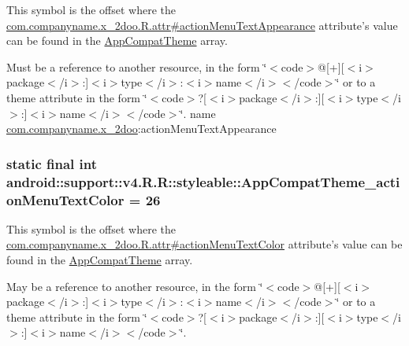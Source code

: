 This symbol is the offset where the \hyperlink{classcom_1_1companyname_1_1x__2doo_1_1_r_1_1attr_1a28aee481938a8a70bf5715b0402af9}{com.companyname.x\_\-2doo.R.attr\#actionMenuTextAppearance} attribute's value can be found in the \hyperlink{classandroid_1_1support_1_1v4_1_1_r_1_1styleable_0873e92ba21076bb5a4aeadeb7f5779f}{AppCompatTheme} array.

Must be a reference to another resource, in the form \char`\"{}$<$code$>$@\mbox{[}+\mbox{]}\mbox{[}$<$i$>$package$<$/i$>$:\mbox{]}$<$i$>$type$<$/i$>$:$<$i$>$name$<$/i$>$$<$/code$>$\char`\"{} or to a theme attribute in the form \char`\"{}$<$code$>$?\mbox{[}$<$i$>$package$<$/i$>$:\mbox{]}\mbox{[}$<$i$>$type$<$/i$>$:\mbox{]}$<$i$>$name$<$/i$>$$<$/code$>$\char`\"{}.  name \hyperlink{namespacecom_1_1companyname_1_1x__2doo}{com.companyname.x\_\-2doo}:actionMenuTextAppearance \hypertarget{classandroid_1_1support_1_1v4_1_1_r_1_1styleable_7c5193ab46252c56ec1b49d531de7e9d}{
\subsubsection[{AppCompatTheme\_\-actionMenuTextColor}]{\setlength{\rightskip}{0pt plus 5cm}static final int android::support::v4.R.R::styleable::AppCompatTheme\_\-actionMenuTextColor = 26}}
\label{classandroid_1_1support_1_1v4_1_1_r_1_1styleable_7c5193ab46252c56ec1b49d531de7e9d}


This symbol is the offset where the \hyperlink{classcom_1_1companyname_1_1x__2doo_1_1_r_1_1attr_6572796995e450d68baacd8e8ff1d867}{com.companyname.x\_\-2doo.R.attr\#actionMenuTextColor} attribute's value can be found in the \hyperlink{classandroid_1_1support_1_1v4_1_1_r_1_1styleable_0873e92ba21076bb5a4aeadeb7f5779f}{AppCompatTheme} array.

May be a reference to another resource, in the form \char`\"{}$<$code$>$@\mbox{[}+\mbox{]}\mbox{[}$<$i$>$package$<$/i$>$:\mbox{]}$<$i$>$type$<$/i$>$:$<$i$>$name$<$/i$>$$<$/code$>$\char`\"{} or to a theme attribute in the form \char`\"{}$<$code$>$?\mbox{[}$<$i$>$package$<$/i$>$:\mbox{]}\mbox{[}$<$i$>$type$<$/i$>$:\mbox{]}$<$i$>$name$<$/i$>$$<$/code$>$\char`\"{}. 

